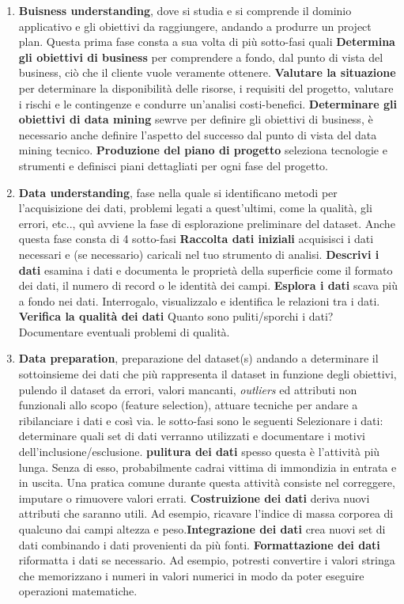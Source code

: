 \documentclass[italian,12pt,a4paper]{article}
\begin{document}
	\begin{enumerate}
		\item \textbf{Buisness understanding}, dove si studia e si comprende il dominio applicativo e gli obiettivi da raggiungere, andando a produrre un project plan. Questa prima fase consta a sua volta di più sotto-fasi quali \textbf{Determina gli obiettivi di business} per comprendere a fondo, dal punto di vista del business, ciò che il cliente vuole veramente ottenere. \textbf{Valutare la situazione}  per determinare la disponibilità delle risorse, i requisiti del progetto, valutare i rischi e le contingenze e condurre un'analisi costi-benefici. \textbf{Determinare gli obiettivi di data mining} sewrve per definire gli obiettivi di business, è necessario anche definire l'aspetto del successo dal punto di vista del data mining tecnico. \textbf{Produzione del piano di progetto} seleziona tecnologie e strumenti e definisci piani dettagliati per ogni fase del progetto.
		\item \textbf{Data understanding}, fase nella quale si identificano metodi per l'acquisizione dei dati, problemi legati a quest'ultimi, come la qualità, gli errori, etc.., quì avviene la fase di esplorazione preliminare del dataset. Anche questa fase consta di 4 sotto-fasi \textbf{Raccolta  dati iniziali} acquisisci i dati necessari e (se necessario) caricali nel tuo strumento di analisi. \textbf{Descrivi i dati} esamina i dati e documenta le proprietà della superficie come il formato dei dati, il numero di record o le identità dei campi. \textbf{Esplora i dati} scava più a fondo nei dati. Interrogalo, visualizzalo e identifica le relazioni tra i dati. \textbf{Verifica la qualità dei dati} Quanto sono puliti/sporchi i dati? Documentare eventuali problemi di qualità.
		\item \textbf{Data preparation}, preparazione del dataset(s) andando a determinare il sottoinsieme dei dati che più rappresenta il dataset in funzione degli obiettivi, pulendo il dataset da errori, valori mancanti, \textit{outliers} ed attributi non funzionali allo scopo (feature selection), attuare tecniche per andare a ribilanciare i dati e così via. le sotto-fasi sono le seguenti Selezionare i dati: determinare quali set di dati verranno utilizzati e documentare i motivi dell'inclusione/esclusione. \textbf{pulitura dei dati} spesso questa è l'attività più lunga. Senza di esso, probabilmente cadrai vittima di immondizia in entrata e in uscita. Una pratica comune durante questa attività consiste nel correggere, imputare o rimuovere valori errati. \textbf{Costruizione dei dati} deriva nuovi attributi che saranno utili. Ad esempio, ricavare l'indice di massa corporea di qualcuno dai campi altezza e peso.\textbf{Integrazione dei dati} crea nuovi set di dati combinando i dati provenienti da più fonti. \textbf{Formattazione dei dati} riformatta i dati se necessario. Ad esempio, potresti convertire i valori stringa che memorizzano i numeri in valori numerici in modo da poter eseguire operazioni matematiche.

\end{enumerate}
\end{document}
